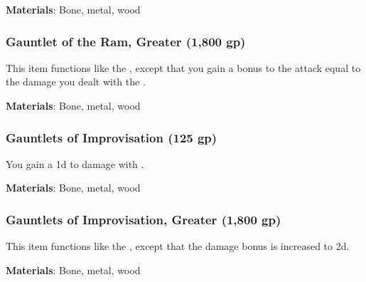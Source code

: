 \vspace{0.25em}
\textbf{Materials}: Bone, metal, wood


\lowercase{\hypertarget{item:Gauntlet of the Ram, Greater}{}}\label{item:Gauntlet of the Ram, Greater}
\hypertarget{item:Gauntlet of the Ram, Greater}{\subsubsection{Gauntlet of the Ram, Greater\hfill{} (1,800 gp)}}

This item functions like the , except that you gain a bonus to the  attack equal to the damage you dealt with the .



\vspace{0.25em}
\textbf{Materials}: Bone, metal, wood


\lowercase{\hypertarget{item:Gauntlets of Improvisation}{}}\label{item:Gauntlets of Improvisation}
\hypertarget{item:Gauntlets of Improvisation}{\subsubsection{Gauntlets of Improvisation\hfill{} (125 gp)}}

You gain a \plus1d  to damage with .



\vspace{0.25em}
\textbf{Materials}: Bone, metal, wood


\lowercase{\hypertarget{item:Gauntlets of Improvisation, Greater}{}}\label{item:Gauntlets of Improvisation, Greater}
\hypertarget{item:Gauntlets of Improvisation, Greater}{\subsubsection{Gauntlets of Improvisation, Greater\hfill{} (1,800 gp)}}

This item functions like the , except that the damage bonus is increased to \plus2d.



\vspace{0.25em}
\textbf{Materials}: Bone, metal, wood


